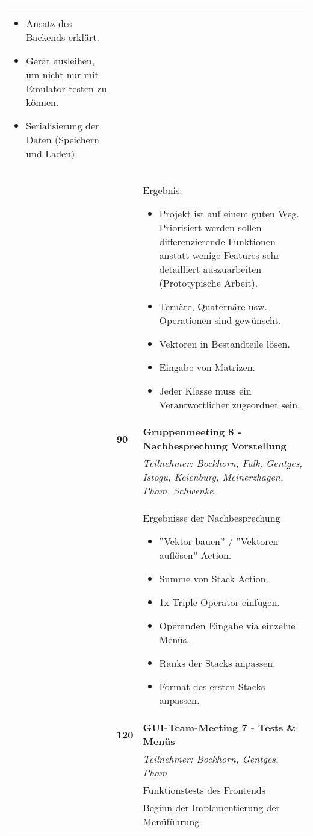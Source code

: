 {{\begin{longtable}{|l|l|p{11cm}|}
\begin{itemize}
				\item Ansatz des Backends erklärt.
				\item Gerät ausleihen, um nicht nur mit Emulator testen zu können.
				\item Serialisierung der Daten (Speichern und Laden).
			\end{itemize}
			\\ & &
			Ergebnis:
			\begin{itemize}\renewcommand\labelitemi{--}
				\item Projekt ist auf einem guten Weg. Priorisiert werden sollen differenzierende Funktionen anstatt wenige Features sehr detailliert auszuarbeiten (Prototypische Arbeit).
				\item Ternäre, Quaternäre usw. Operationen sind gewünscht.
				\item Vektoren in Bestandteile lösen.
				\item Eingabe von Matrizen.
				\item Jeder Klasse muss ein Verantwortlicher zugeordnet sein.
			\end{itemize}		
		\\ \cline{2-3}
		& \textbf{\hfill90} & \textbf{Gruppenmeeting 8 - Nachbesprechung Vorstellung}
			\\ & &
			\small{\textit{Teilnehmer: Bockhorn, Falk, Gentges, Istogu, Keienburg, Meinerzhagen, Pham, Schwenke}}
			\\ & &
			Ergebnisse der Nachbesprechung
			\begin{itemize}\renewcommand\labelitemi{--}
				\item ''Vektor bauen'' / ''Vektoren auflösen'' Action. 
				\item Summe von Stack Action.
				\item 1x Triple Operator einfügen.
				\item Operanden Eingabe via einzelne Menüs.
				\item Ranks der Stacks anpassen.
				\item Format des ersten Stacks anpassen.
			\end{itemize}
		\\ \cline{2-3}
		& \textbf{\hfill120} & \textbf{GUI-Team-Meeting 7 - Tests \& Menüs } 
			\\ & &
			\small{\textit{Teilnehmer: Bockhorn, Gentges, Pham}}
			\\ & &
			Funktionstests des Frontends 
			\\ & &
			Beginn der Implementierung der Menüführung			
	\\ \hline

\end{longtable}}}
